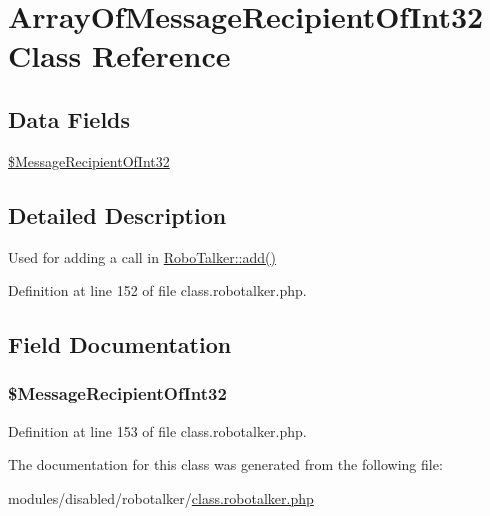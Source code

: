 \hypertarget{class_array_of_message_recipient_of_int32}{\section{Array\-Of\-Message\-Recipient\-Of\-Int32 Class Reference}
\label{class_array_of_message_recipient_of_int32}
}
\subsection*{Data Fields}
\begin{DoxyCompactItemize}
\item 
\hyperlink{class_array_of_message_recipient_of_int32_a6b5727823285f1bcb9ee8061f4fc6a49}{\$\-Message\-Recipient\-Of\-Int32}
\end{DoxyCompactItemize}


\subsection{Detailed Description}
Used for adding a call in \hyperlink{class_robo_talker_ac0650c287190d98e1d85ff9ef10a7404}{Robo\-Talker\-::add()} 

Definition at line 152 of file class.\-robotalker.\-php.



\subsection{Field Documentation}
\hypertarget{class_array_of_message_recipient_of_int32_a6b5727823285f1bcb9ee8061f4fc6a49}{
\subsubsection[{\$\-Message\-Recipient\-Of\-Int32}]{\setlength{\rightskip}{0pt plus 5cm}\${\bf Message\-Recipient\-Of\-Int32}}}\label{class_array_of_message_recipient_of_int32_a6b5727823285f1bcb9ee8061f4fc6a49}


Definition at line 153 of file class.\-robotalker.\-php.



The documentation for this class was generated from the following file\-:\begin{DoxyCompactItemize}
\item 
modules/disabled/robotalker/\hyperlink{class_8robotalker_8php}{class.\-robotalker.\-php}\end{DoxyCompactItemize}
